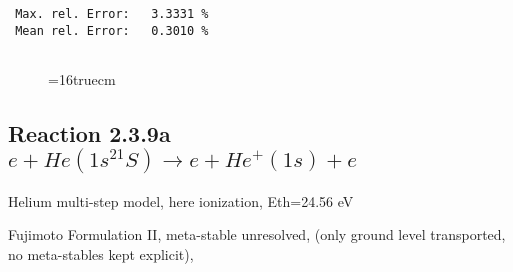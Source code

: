 \documentclass[12pt,dvipdfmx]{article}
\begin{document}
\begin{small}
\begin{verbatim}
 Max. rel. Error:   3.3331 %
 Mean rel. Error:   0.3010 %


\end{verbatim}\end{small}
\begin{figure} \label{2.2.14}
\epsfxsize=16truecm
\end{figure}
\newpage




\subsection{
Reaction 2.3.9a  $e + He(1s^21S) \rightarrow  e + He^+(1s) + e $
}
Helium multi-step model, here ionization, Eth=24.56 eV

 Fujimoto Formulation II, meta-stable unresolved, (only ground level transported, no meta-stables
 kept explicit), \cite{kn:Fujimoto}
\end{document}
